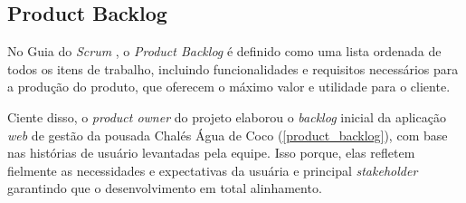 \documentclass[
	12pt,				%
	openany,			%
	twoside,			%
	a4paper,			%
	english,			%
	french,				%
	spanish,			%
	brazil				%
	]{abntex2}
\begin{document}
\subsection{Product Backlog}
No Guia do \textit{Scrum} \cite{scrumguide}, o \textit{Product Backlog} é definido como uma lista ordenada de todos os itens de trabalho, incluindo funcionalidades e requisitos necessários para a produção do produto, que oferecem o máximo valor e utilidade para o cliente.

Ciente disso, o \textit{product owner} do projeto elaborou o \textit{backlog} inicial da aplicação \textit{web} de gestão da pousada Chalés Água de Coco (\autoref{product_backlog}), com base nas histórias de usuário levantadas pela equipe. Isso porque, elas refletem fielmente as necessidades e expectativas da usuária e principal \textit {stakeholder} garantindo que o desenvolvimento em total alinhamento.
%
\end{document}
